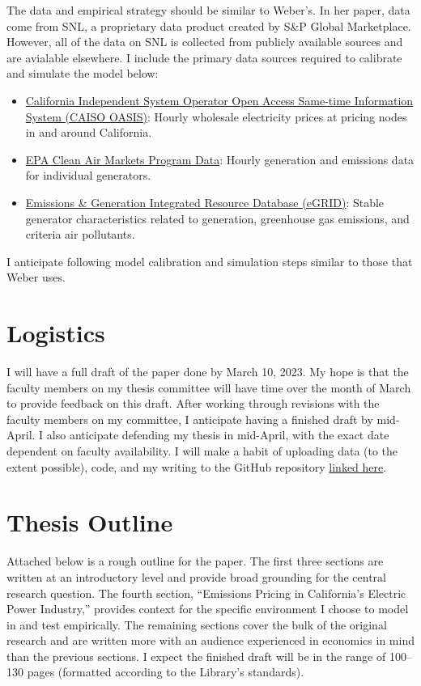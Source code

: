 \documentclass[11pt]{article}
\begin{document}
The data and empirical strategy should be similar to Weber's. In her paper, data come from SNL, a proprietary data product created by S\&P Global Marketplace. However, all of the data on SNL is collected from publicly available sources and are avialable elsewhere. I include the primary data sources required to calibrate and simulate the model below: 
\begin{itemize}
	\item \href{http://oasis.caiso.com/mrioasis/logon.do}{California Independent System Operator Open Access Same-time Information System (CAISO OASIS)}: Hourly wholesale electricity prices at pricing nodes in and around California.  
	\item \href{https://campd.epa.gov/data/bulk-data-files}{EPA Clean Air Markets Program Data}: Hourly generation and emissions data for individual generators. 
	\item \href{https://www.epa.gov/egrid}{Emissions \& Generation Integrated Resource Database (eGRID)}: Stable generator characteristics related to generation, greenhouse gas emissions, and criteria air pollutants.
\end{itemize}
I anticipate following model calibration and simulation steps similar to those that Weber uses. 

\section*{Logistics}

I will have a full draft of the paper done by March 10, 2023. My hope is that the faculty members on my thesis committee will have time over the month of March to provide feedback on this draft. After working through revisions with the faculty members on my committee, I anticipate having a finished draft by mid-April. I also anticipate defending my thesis in mid-April, with the exact date dependent on faculty availability. I will make a habit of uploading data (to the extent possible), code, and my writing to the GitHub repository \href{https://github.com/EAPerry/seniorThesis}{linked here}. 

\section*{Thesis Outline}

Attached below is a rough outline for the paper. The first three sections are written at an introductory level and provide broad grounding for the central research question. The fourth section, ``Emissions Pricing in California's Electric Power Industry,'' provides context for the specific environment I choose to model in and test empirically. The remaining sections cover the bulk of the original research and are written more with an audience experienced in economics in mind than the previous sections. I expect the finished draft will be in the range of 100--130 pages (formatted according to the Library's standards).
\end{document}
